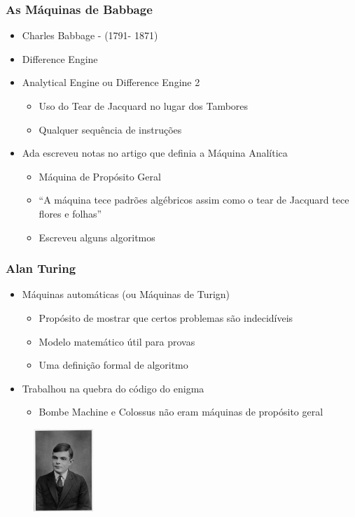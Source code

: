 \documentclass{beamer}
\begin{document}
\begin{frame}
    \frametitle{As M\'aquinas de Babbage}
    \begin{itemize}
        \item Charles Babbage - (1791- 1871)
        \item Difference Engine
        \item Analytical Engine ou Difference Engine 2
            \begin{itemize}
                \item Uso do Tear de Jacquard no lugar dos Tambores
                \item Qualquer sequ\^encia de instru\c{c}\~oes
            \end{itemize}
        \item Ada escreveu notas no artigo que definia a M\'aquina Anal\'itica
            \begin{itemize}
                \item M\'aquina de Prop\'osito Geral
                \item ``A m\'aquina tece padr\~oes alg\'ebricos assim como o tear de Jacquard tece flores e folhas''
                \item Escreveu alguns algoritmos
            \end{itemize}
    \end{itemize}
\end{frame}

\begin{frame}
    \frametitle{Alan Turing}
    \begin{itemize}
        \item M\'aquinas autom\'aticas (ou M\'aquinas de Turign)
            \begin{itemize}
                \item Prop\'osito de mostrar que certos problemas s\~ao indecid\'iveis
                \item Modelo matem\'atico \'util para provas
                \item Uma defini\c{c}\~ao formal de algoritmo
            \end{itemize}
        \item Trabalhou na quebra do c\'odigo do enigma
            \begin{itemize}
                \item Bombe Machine e Colossus n\~ao eram m\'aquinas de prop\'osito geral
            \end{itemize}
    \end{itemize}
    \begin{figure}
        \includegraphics[width = 0.2\textwidth]{figures/alan}
    \end{figure}

\end{frame}
\end{document}
